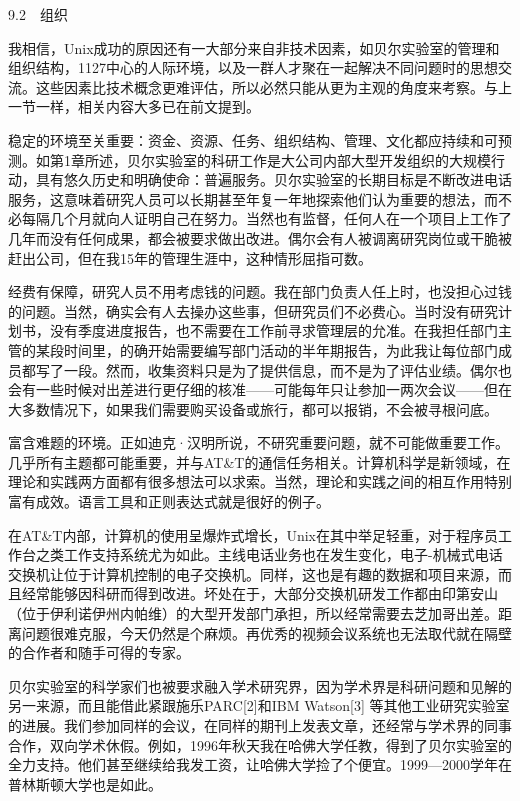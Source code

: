 \documentclass[a4paper,12pt,UTF8,twoside]{ctexbook}
\begin{document}
9.2　组织


我相信，Unix成功的原因还有一大部分来自非技术因素，如贝尔实验室的管理和组织结构，1127中心的人际环境，以及一群人才聚在一起解决不同问题时的思想交流。这些因素比技术概念更难评估，所以必然只能从更为主观的角度来考察。与上一节一样，相关内容大多已在前文提到。

稳定的环境至关重要：资金、资源、任务、组织结构、管理、文化都应持续和可预测。如第1章所述，贝尔实验室的科研工作是大公司内部大型开发组织的大规模行动，具有悠久历史和明确使命：普遍服务。贝尔实验室的长期目标是不断改进电话服务，这意味着研究人员可以长期甚至年复一年地探索他们认为重要的想法，而不必每隔几个月就向人证明自己在努力。当然也有监督，任何人在一个项目上工作了几年而没有任何成果，都会被要求做出改进。偶尔会有人被调离研究岗位或干脆被赶出公司，但在我15年的管理生涯中，这种情形屈指可数。

经费有保障，研究人员不用考虑钱的问题。我在部门负责人任上时，也没担心过钱的问题。当然，确实会有人去操办这些事，但研究员们不必费心。当时没有研究计划书，没有季度进度报告，也不需要在工作前寻求管理层的允准。在我担任部门主管的某段时间里，的确开始需要编写部门活动的半年期报告，为此我让每位部门成员都写了一段。然而，收集资料只是为了提供信息，而不是为了评估业绩。偶尔也会有一些时候对出差进行更仔细的核准——可能每年只让参加一两次会议——但在大多数情况下，如果我们需要购买设备或旅行，都可以报销，不会被寻根问底。

富含难题的环境。正如迪克·汉明所说，不研究重要问题，就不可能做重要工作。几乎所有主题都可能重要，并与AT\&T的通信任务相关。计算机科学是新领域，在理论和实践两方面都有很多想法可以求索。当然，理论和实践之间的相互作用特别富有成效。语言工具和正则表达式就是很好的例子。

在AT\&T内部，计算机的使用呈爆炸式增长，Unix在其中举足轻重，对于程序员工作台之类工作支持系统尤为如此。主线电话业务也在发生变化，电子-机械式电话交换机让位于计算机控制的电子交换机。同样，这也是有趣的数据和项目来源，而且经常能够因科研而得到改进。坏处在于，大部分交换机研发工作都由印第安山（位于伊利诺伊州内帕维）的大型开发部门承担，所以经常需要去芝加哥出差。距离问题很难克服，今天仍然是个麻烦。再优秀的视频会议系统也无法取代就在隔壁的合作者和随手可得的专家。

贝尔实验室的科学家们也被要求融入学术研究界，因为学术界是科研问题和见解的另一来源，而且能借此紧跟施乐PARC[2]和IBM Watson[3] 等其他工业研究实验室的进展。我们参加同样的会议，在同样的期刊上发表文章，还经常与学术界的同事合作，双向学术休假。例如，1996年秋天我在哈佛大学任教，得到了贝尔实验室的全力支持。他们甚至继续给我发工资，让哈佛大学捡了个便宜。1999—2000学年在普林斯顿大学也是如此。
\end{document}
